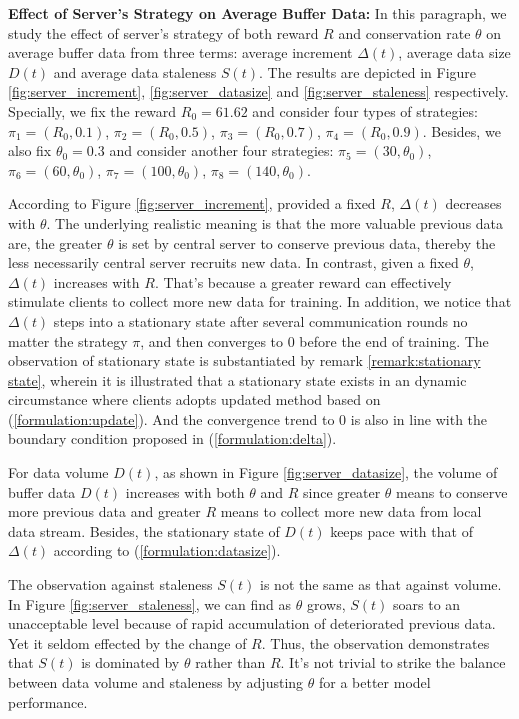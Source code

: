 \documentclass{article}
\theoremstyle{plain}
\theoremstyle{definition}
\theoremstyle{remark}
\begin{document}
\textbf{Effect of Server's Strategy on Average Buffer Data: }
In this paragraph, we study the effect of server's strategy of both reward $R$ and conservation rate $\theta$ on average buffer data from three terms: average increment $\Delta(t)$, average data size $D(t)$ and average data staleness $S(t)$. The results are depicted in Figure \ref{fig:server_increment}, \ref{fig:server_datasize} and \ref{fig:server_staleness} respectively.
Specially, we fix the reward $R_0=61.62$ and consider four types of strategies: $\pi_1=(R_0, 0.1)$, $\pi_2=(R_0, 0.5)$, $\pi_3=(R_0, 0.7)$, $\pi_4=(R_0, 0.9)$. Besides, we also fix $\theta_0=0.3$ and consider another four strategies: $\pi_5=(30, \theta_0)$, $\pi_6=(60, \theta_0)$, $\pi_7=(100, \theta_0)$, $\pi_8=(140, \theta_0)$.

According to Figure \ref{fig:server_increment}, provided a fixed $R$, $\Delta(t)$ decreases with $\theta$. The underlying realistic meaning is that the more valuable previous data are, the greater $\theta$ is set by central server to conserve previous data, thereby the less necessarily central server recruits new data.
In contrast, given a fixed $\theta$, $\Delta(t)$ increases with $R$. That's because a greater reward can effectively stimulate clients to collect more new data for training.
In addition, we notice that $\Delta(t)$ steps into a stationary state after several communication rounds no matter the strategy $\pi$, and then converges to $0$ before the end of training.
The observation of stationary state is substantiated by remark \ref{remark:stationary state}, wherein it is illustrated that a stationary state exists in an dynamic circumstance where clients adopts updated method based on (\ref{formulation:update}).
And the convergence trend to $0$ is also in line with the boundary condition proposed in (\ref{formulation:delta}).

For data volume $D(t)$, as shown in Figure \ref{fig:server_datasize}, the volume of buffer data $D(t)$ increases with both $\theta$ and $R$ since greater $\theta$ means to conserve more previous data and greater $R$ means to collect more new data from local data stream.
Besides, the stationary state of $D(t)$ keeps pace with that of $\Delta(t)$ according to (\ref{formulation:datasize}).

The observation against staleness $S(t)$ is not the same as that against volume. In Figure \ref{fig:server_staleness}, we can find as $\theta$ grows, $S(t)$ soars to an unacceptable level because of rapid accumulation of deteriorated previous data. Yet it seldom effected by the change of $R$. Thus, the observation demonstrates that $S(t)$ is dominated by $\theta$ rather than $R$. It's not trivial to strike the balance between data volume and staleness by adjusting $\theta$ for a better model performance. 
\end{document}
